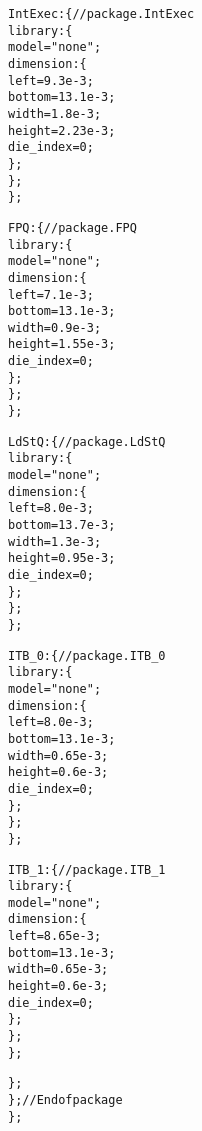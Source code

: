 {\begin{alltt}
            IntExec: \{ // package.IntExec
                library: \{
                    model = "none";
                    dimension: \{
                        left = 9.3e-3;
                        bottom = 13.1e-3;
                        width = 1.8e-3;
                        height = 2.23e-3;
                        die_index = 0;
                    \};
                \};
            \};

            FPQ: \{ // package.FPQ
                library: \{
                    model = "none";
                    dimension: \{
                        left = 7.1e-3;
                        bottom = 13.1e-3;
                        width = 0.9e-3;
                        height = 1.55e-3;
                        die_index = 0;
                    \};
                \};
            \};

            LdStQ: \{ // package.LdStQ
                library: \{
                    model = "none";
                    dimension: \{
                        left = 8.0e-3;
                        bottom = 13.7e-3;
                        width = 1.3e-3;
                        height = 0.95e-3;
                        die_index = 0;
                    \};
                \};
            \};
            
            ITB\_0: \{ // package.ITB\_0
                library: \{
                    model = "none";
                    dimension: \{
                        left = 8.0e-3;
                        bottom = 13.1e-3;
                        width = 0.65e-3;
                        height = 0.6e-3;
                        die_index = 0;
                    \};
                \};
            \};

            ITB\_1: \{ // package.ITB\_1
                library: \{
                    model = "none";
                    dimension: \{
                        left = 8.65e-3;
                        bottom = 13.1e-3;
                        width = 0.65e-3;
                        height = 0.6e-3;
                        die_index = 0;
                    \};
                \};
            \};
            
        \};
    \}; // End of package
\};
\end{alltt}}

\pagebreak
